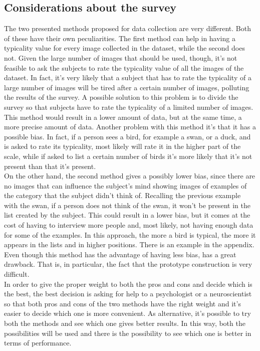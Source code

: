 \documentclass[conference]{IEEEtran}
\begin{document}
		\subsection{Considerations about the survey}
		
			\noindent The two presented methods proposed for data collection are very different. Both of these have their own peculiarities. The first method can help in having a typicality value for every image collected in the dataset, 
			while the second does not. Given the large number of images that should be used, though, it's not feasible to ask the subjects to rate the typicality value of all the images of the dataset. In fact, it's very likely 
			that a subject that has to rate the typicality of a large number of images will be tired after a certain number of images, polluting the results of the survey. A possible solution to this problem is to 
			divide the survey so that subjects have to rate the typicality of a limited number of images. This method would result in a lower amount of data, but at the same time, a more precise amount of data. Another 
			problem with this method it's that it has a possible bias. In fact, if a person sees a bird, for example a swan, or a duck, and is asked to rate its typicality, most likely will rate it in the higher part 
			of the scale, while if asked to list a certain number of birds it's more likely that it's not present than that it's present.\\
			On the other hand, the second method gives a possibly lower bias, since there are no images that can influence the subject's mind showing images of examples of the category that the subject didn't think of. 
			Recalling the previous example with the swan, if a person does not think of the swan, it won't be present in the list created by the subject. This could result in a lower bias, but it comes at the cost 
			of having to interview more people and, most likely, not having enough data for some of the examples. In this approach, the more a bird is typical, the more it appears in the lists and in higher positions. 
			There is an example in the appendix. Even though this method has the advantage of having less bias, has a  great drawback. That is, in particular, the fact that the prototype construction is very difficult.\\
			In order to give the proper weight to both the pros and cons and decide which is the best, the best decision is asking for help to a psychologist or a neuroscientist so that both pros and cons of the two 
			methods have the right weight and it's easier to decide which one is more convenient.
			As alternative, it's possible to try both the methods and see which one gives better results. In this way, both the possibilities will be used and there is the possibility to see which one is better in 
			terms of performance. 
			
\end{document}
